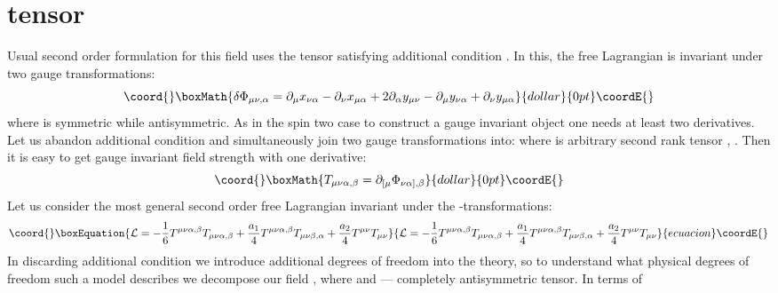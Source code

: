 \documentclass[a4paper,12pt]{article}
\begin{document}
\section{\myHighlight{$\Phi_{[\mu\nu],\alpha}$}\coordHE{} tensor}

Usual second order formulation for this field uses the tensor
\myHighlight{$\Phi_{[\mu\nu],\alpha}$}\coordHE{} satisfying additional condition
\coordHE{}. In this, the free Lagrangian is
invariant under two gauge transformations:
$$\coord{}\boxMath{
\delta \Phi_{\mu\nu,\alpha} = \partial_\mu x_{\nu\alpha} -
\partial_\nu x_{\mu\alpha} + 2 \partial_\alpha y_{\mu\nu} -
\partial_\mu y_{\nu\alpha} + \partial_\nu y_{\mu\alpha}
}{dollar}{0pt}\coordE{}$$
where \coordHE{} is symmetric while \coordHE{}
antisymmetric. As in the spin two case to construct a gauge invariant
object one needs at least two derivatives. Let us abandon additional
condition \coordHE{} and simultaneously join two
gauge transformations into:
\coordHE{}
where \coordHE{} is arbitrary second rank tensor \cite{BCNS02},
\cite{BCCSS03}. Then it is easy to get gauge invariant field strength
with one derivative:
$$\coord{}\boxMath{
T_{\mu\nu\alpha,\beta} = \partial_{[\mu} \Phi_{\nu\alpha],\beta}
}{dollar}{0pt}\coordE{}$$
Let us consider the most general second order free Lagrangian
invariant under the \coordHE{}-transformations:
\begin{equation}\coord{}\boxEquation{
{\cal L} = - \frac{1}{6} T^{\mu\nu\alpha,\beta} T_{\mu\nu\alpha,\beta}
+ \frac{a_1}{4} T^{\mu\nu\alpha,\beta} T_{\mu\nu\beta,\alpha} +
\frac{a_2}{4} T^{\mu\nu} T_{\mu\nu}
}{
{\cal L} = - \frac{1}{6} T^{\mu\nu\alpha,\beta} T_{\mu\nu\alpha,\beta}
+ \frac{a_1}{4} T^{\mu\nu\alpha,\beta} T_{\mu\nu\beta,\alpha} +
\frac{a_2}{4} T^{\mu\nu} T_{\mu\nu}
}{ecuacion}\coordE{}\end{equation}
In discarding additional condition \coordHE{} we
introduce additional degrees of freedom into the theory, so to
understand what physical degrees of freedom such a model describes we
decompose our field
\coordHE{}, where \coordHE{} and
\coordHE{} --- completely antisymmetric tensor. In terms of
\end{document}
